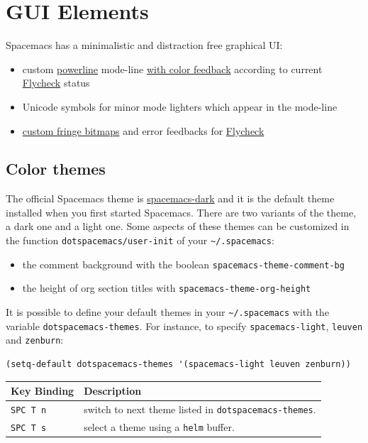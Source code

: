 \documentclass[11pt]{article}
\begin{document}
\section{GUI Elements}
\label{sec:org54f4a14}
Spacemacs has a minimalistic and distraction free graphical UI:
\begin{itemize}
\item custom \href{https://github.com/milkypostman/powerline}{powerline} mode-line \hyperref[sec:org5995c01]{with color feedback} according to current \href{https://github.com/flycheck/flycheck}{Flycheck} status
\item Unicode symbols for minor mode lighters which appear in the mode-line
\item \hyperref[sec:org91d20ad]{custom fringe bitmaps} and error feedbacks for \href{https://github.com/flycheck/flycheck}{Flycheck}
\end{itemize}

\subsection{Color themes}
\label{sec:org18d2521}
The official Spacemacs theme is \href{https://github.com/nashamri/spacemacs-theme}{spacemacs-dark} and it is the default theme
installed when you first started Spacemacs. There are two variants of the
theme, a dark one and a light one. Some aspects of these themes can be customized
in the function \texttt{dotspacemacs/user-init} of your \texttt{\textasciitilde{}/.spacemacs}:
\begin{itemize}
\item the comment background with the boolean \texttt{spacemacs-theme-comment-bg}
\item the height of org section titles with \texttt{spacemacs-theme-org-height}
\end{itemize}

It is possible to define your default themes in your \texttt{\textasciitilde{}/.spacemacs} with the
variable \texttt{dotspacemacs-themes}. For instance, to specify \texttt{spacemacs-light},
\texttt{leuven} and \texttt{zenburn}:

\begin{verbatim}
(setq-default dotspacemacs-themes '(spacemacs-light leuven zenburn))
\end{verbatim}

\begin{center}
\begin{tabular}{ll}
Key Binding & Description\\
\hline
\texttt{SPC T n} & switch to next theme listed in \texttt{dotspacemacs-themes}.\\
\texttt{SPC T s} & select a theme using a \texttt{helm} buffer.\\
\end{tabular}
\end{center}
\end{document}
